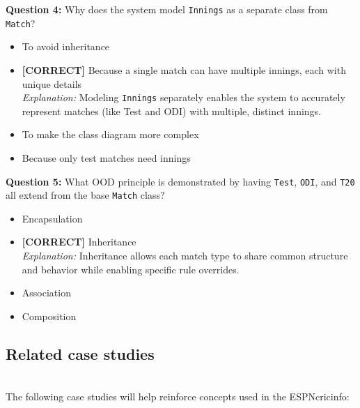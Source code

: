 \vspace{0.3cm}
\noindent
\textbf{Question 4:} Why does the system model \texttt{Innings} as a separate class from \texttt{Match}?
\\[0.2cm]
\begin{itemize}
 \item To avoid inheritance
 \item \textbf{[CORRECT]} Because a single match can have multiple innings, each with unique details
\\[0.1cm]
\textit{Explanation:} 
Modeling \texttt{Innings} separately enables the system to accurately represent matches (like Test and ODI) with multiple, distinct innings.
 \item To make the class diagram more complex
 \item Because only test matches need innings
\end{itemize}
\vspace{0.3cm}
\noindent
\textbf{Question 5:} What OOD principle is demonstrated by having \texttt{Test}, \texttt{ODI}, and \texttt{T20} all extend from the base \texttt{Match} class?
\\[0.2cm]
\begin{itemize}
 \item Encapsulation
 \item \textbf{[CORRECT]} Inheritance
\\[0.1cm]
\textit{Explanation:} 
Inheritance allows each match type to share common structure and behavior while enabling specific rule overrides.
 \item Association
 \item Composition
\end{itemize}

\subsection{Related case studies}\label{d4O1Z3eGOZ_pozmAypdhj}
\\
The following case studies will help reinforce concepts used in the ESPNcricinfo:

